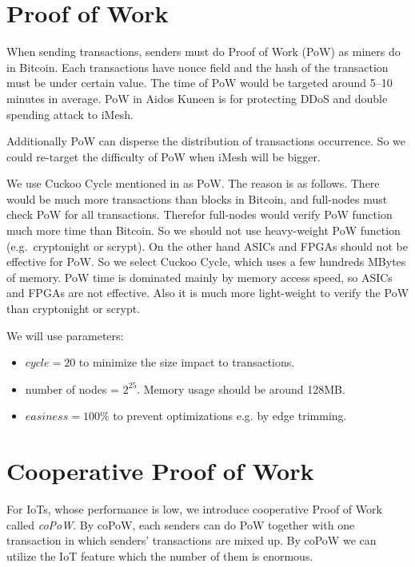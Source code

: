 \documentclass[a4paper,10pt,twocolumn]{article}
\begin{document}
\section{Proof of Work}
\label{sec:pow}

When sending transactions, senders must do Proof of Work (PoW) as miners do in Bitcoin.
Each transactions have nonce field
and the hash of the transaction must be under certain value.  The time of PoW would be targeted
around 5--10 minutes in average.
PoW in Aidos Kuneen is for protecting DDoS and double spending attack to iMesh. 

Additionally PoW can disperse the distribution
of transactions occurrence. So we could re-target the difficulty of PoW when iMesh will be bigger.

We use Cuckoo Cycle mentioned in \cite{cuckoo} as PoW. The reason is as follows.
There would be much more transactions than blocks in Bitcoin, and full-nodes
must check PoW for all transactions. Therefor full-nodes would verify
PoW function much more time than Bitcoin. So we should not use heavy-weight PoW function (e.g.\ cryptonight or scrypt).
On the other hand ASICs and FPGAs should not be effective for PoW.
So we select Cuckoo Cycle, which  uses a few hundreds MBytes of memory.
PoW time is dominated mainly by  memory access speed, so ASICs and FPGAs are not effective.
Also it is much more light-weight to verify the PoW than cryptonight or scrypt.

We will use parameters:

\begin{itemize}
	\item \(cycle = 20\) to minimize the size impact to transactions.
    \item number of nodes = \( 2^{25} \). Memory usage should be around 128MB.
    \item \(easiness = 100\% \) to prevent optimizations e.g. by edge trimming.
\end{itemize}

\section{Cooperative Proof of Work}
\label{sec:copow}

For IoTs, whose performance is low, we introduce cooperative Proof of Work called \emph{coPoW}.
By coPoW, each senders can do PoW together with one transaction in which  senders' transactions are mixed up.
By coPoW we can utilize the IoT feature which the number of them is enormous.
\end{document}
